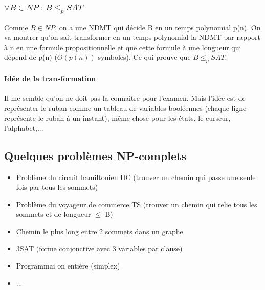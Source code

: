 \subsubsection{$\forall B \in NP \ : \  B\leq_p SAT $}
Comme $B \in NP$, on a une NDMT qui décide B en un temps polynomial p(n). On va
montrer qu'on sait transformer en un temps polynomial la NDMT par rapport à n
en une formule propositionnelle et que cette formule à une longueur qui dépend 
de p(n) ($O(p(n))$ symboles). Ce qui prouve que $B \leq_p SAT$.

\paragraph{Idée de la transformation} Il me semble qu'on ne doit pas la connaitre
pour l'examen. Mais l'idée est de représenter le ruban comme un tableau de
variables booléennes (chaque ligne représente le ruban à un instant), 
même chose pour les états, le curseur, l'alphabet,...


\subsection{Quelques problèmes NP-complets}
\begin{itemize}
	\item Problème du circuit hamiltonien HC (trouver un chemin qui passe
		une seule fois par tous les sommets)
	\item Problème du voyageur de commerce TS (trouver un chemin qui relie
		tous les sommets et de longueur $\leq$ B)
	\item Chemin le plus long entre 2 sommets dans un graphe
	\item 3SAT (forme conjonctive avec 3 variables par clause)
	\item Programmai on entière (simplex)
	\item ...
\end{itemize}


